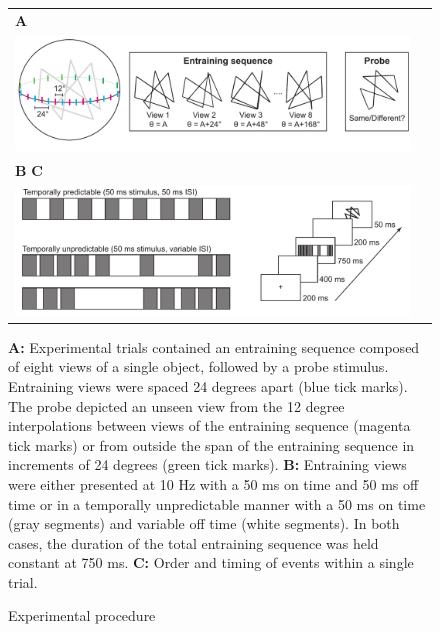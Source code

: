 \documentclass[dwyatte_dissertation.tex]{subfiles}
\begin{document}
\begin{figure}[h!]
\begin{center}
\begin{tabular}{ll}
\textbf{A} \\
\includegraphics[width=160mm]{figs/chap_pleast/paperclip_task.pdf} \\
\textbf{B} \hspace{90mm} \textbf{C} \\
\includegraphics[width=160mm]{figs/chap_pleast/paperclip_ISI.pdf} \\
\end{tabular}
\end{center}
\caption{Experimental procedure}{\textbf{A:} Experimental trials contained an entraining sequence composed of eight views of a single object, followed by a probe stimulus. Entraining views were spaced 24 degrees apart (blue tick marks). The probe depicted an unseen view from the 12 degree interpolations between views of the entraining sequence (magenta tick marks) or from outside the span of the entraining sequence in increments of 24 degrees (green tick marks). \textbf{B:} Entraining views were either presented at 10 Hz with a 50 ms on time and 50 ms off time or in a temporally unpredictable manner with a 50 ms on time (gray segments) and variable off time (white segments). In both cases, the duration of the total entraining sequence was held constant at 750 ms. \textbf{C:} Order and timing  of events within a single trial.}
\label{fig:pleast_task}
\end{figure}
\end{document}

